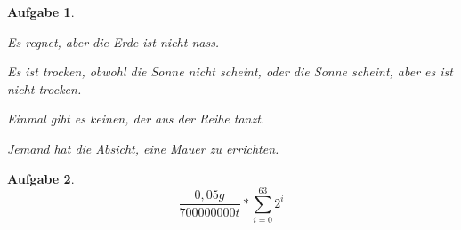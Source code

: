 \documentclass[a4paper,11pt,parskip=half,fleqn]{scrartcl}
\theoremstyle{note}
\newtheorem{aufgabe}{Aufgabe}
\begin{document}
\begin{aufgabe}
  \begin{compactenum}
    \item Es regnet, aber die Erde ist nicht nass.
    \item Es ist trocken, obwohl die Sonne nicht scheint, oder die Sonne scheint, aber es ist nicht trocken.
    \item Einmal gibt es keinen, der aus der Reihe tanzt.
    \item Jemand hat die Absicht, eine Mauer zu errichten.
  \end{compactenum}
\end{aufgabe}
\begin{aufgabe}
  \begin{equation}
    \frac{0,05g}{700000000t}*\sum\limits_{i=0}^{63} 2^i 
  \end{equation}
\end{aufgabe}
\end{document}
